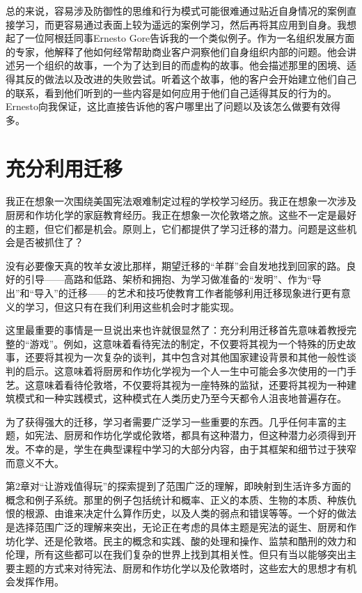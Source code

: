 总的来说，容易涉及防御性的思维和行为模式可能很难通过贴近自身情况的案例直接学习，而更容易通过表面上较为遥远的案例学习，然后再将其应用到自身。我想起了一位阿根廷同事Ernesto Gore告诉我的一个类似例子。作为一名组织发展方面的专家，他解释了他如何经常帮助商业客户洞察他们自身组织内部的问题。他会讲述另一个组织的故事，一个为了达到目的而虚构的故事。他会描述那里的困境、适得其反的做法以及改进的失败尝试。听着这个故事，他的客户会开始建立他们自己的联系，看到他们听到的一些内容是如何应用于他们自己适得其反的行为的。Ernesto向我保证，这比直接告诉他的客户哪里出了问题以及该怎么做要有效得多。

\section*{充分利用迁移}

我正在想象一次围绕美国宪法艰难制定过程的学校学习经历。我正在想象一次涉及厨房和作坊化学的家庭教育经历。我正在想象一次伦敦塔之旅。这些不一定是最好的主题，但它们都是机会。原则上，它们都提供了学习迁移的潜力。问题是这些机会是否被抓住了？

没有必要像天真的牧羊女波比那样，期望迁移的“羊群”会自发地找到回家的路。良好的引导——高路和低路、架桥和拥抱、为学习做准备的“发明”、作为“导出”和“导入”的迁移——的艺术和技巧使教育工作者能够利用迁移现象进行更有意义的学习，但这只有在我们利用这些机会时才能实现。

这里最重要的事情是一旦说出来也许就很显然了：充分利用迁移首先意味着教授完整的“游戏”。例如，这意味着看待宪法的制定，不仅要将其视为一个特殊的历史故事，还要将其视为一次复杂的谈判，其中包含对其他国家建设背景和其他一般性谈判的启示。这意味着将厨房和作坊化学视为一个人一生中可能会多次使用的一门手艺。这意味着看待伦敦塔，不仅要将其视为一座特殊的监狱，还要将其视为一种建筑模式和一种实践模式，这种模式在人类历史乃至今天都令人沮丧地普遍存在。

为了获得强大的迁移，学习者需要广泛学习一些重要的东西。几乎任何丰富的主题，如宪法、厨房和作坊化学或伦敦塔，都具有这种潜力，但这种潜力必须得到开发。不幸的是，学生在典型课程中学习的大部分内容，由于其框架和细节过于狭窄而意义不大。

第2章对“让游戏值得玩”的探索提到了范围广泛的理解，即映射到生活许多方面的概念和例子系统。那里的例子包括统计和概率、正义的本质、生物的本质、种族仇恨的根源、由谁来决定什么算作历史，以及人类的弱点和错误等等。一个好的做法是选择范围广泛的理解来突出，无论正在考虑的具体主题是宪法的诞生、厨房和作坊化学、还是伦敦塔。民主的概念和实践、酸的处理和操作、监禁和酷刑的效力和伦理，所有这些都可以在我们复杂的世界上找到其相关性。但只有当以能够突出主要主题的方式来对待宪法、厨房和作坊化学以及伦敦塔时，这些宏大的思想才有机会发挥作用。

